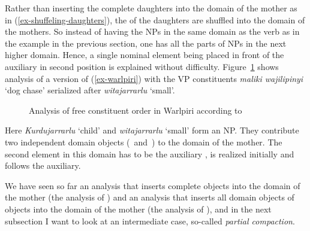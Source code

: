 \documentclass[output=paper
	        ,collection
	        ,collectionchapter
 	        ,biblatex
                ,babelshorthands
                ,newtxmath
                ,draftmode
                ,colorlinks, citecolor=brown
]{langscibook}
\begin{document}
\z
Rather than inserting the complete daughters into the domain of the mother as in
(\ref{ex-shuffeling-daughters}), the \domvs of the daughters are shuffled into the domain of the
mothers. So instead of having the NPs in the same domain as the verb as in the  example in the
previous section, one has all the parts of NPs in the next higher domain. Hence, a single nominal element
being placed in front of the auxiliary in second position is explained without
difficulty. Figure~\ref{fig-warlpiri} shows  analysis of a version of
(\ref{ex-warlpiri}) with the VP constituents \emph{maliki wajilipinyi} `dog chase' serialized after \emph{witajarrarlu} `small'.
\begin{figure}
\caption{\label{fig-warlpiri}Analysis of free constituent order in Warlpiri according to
  \citet[]{DS99a}}
\end{figure}
Here \emph{Kurdujarrarlu} `child' and \emph{witajarrarlu} `small' form an NP. They contribute two independent domain objects (\,
and \,) to the domain of the mother. The second element in this domain has to be the auxiliary
,  is realized initially and  follows the auxiliary.

We have seen so far an analysis that inserts complete objects into the domain of the mother (the
analysis of ) and an analysis that inserts all domain objects of objects into the domain of the
mother (the analysis of ), and in the next
subsection I want to look at an intermediate case, so-called \emph{partial compaction}.
\end{document}
